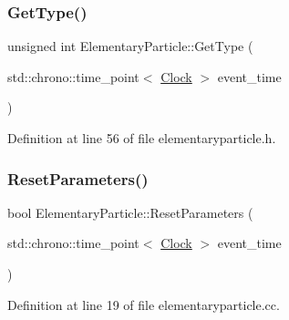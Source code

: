 \subsubsection{\texorpdfstring{Get\+Type()}{GetType()}}
{\footnotesize\ttfamily unsigned int Elementary\+Particle\+::\+Get\+Type (\begin{DoxyParamCaption}\item[{std\+::chrono\+::time\+\_\+point$<$ \mbox{\hyperlink{universe_8h_a0ef8d951d1ca5ab3cfaf7ab4c7a6fd80}{Clock}} $>$}]{event\+\_\+time }\end{DoxyParamCaption})\hspace{0.3cm}{\ttfamily [inline]}}



Definition at line 56 of file elementaryparticle.\+h.

\mbox{\label{class_elementary_particle_ac0f85f34bdfc1d42324201eb7c38e85e}} 
\subsubsection{\texorpdfstring{Reset\+Parameters()}{ResetParameters()}}
{\footnotesize\ttfamily bool Elementary\+Particle\+::\+Reset\+Parameters (\begin{DoxyParamCaption}\item[{std\+::chrono\+::time\+\_\+point$<$ \mbox{\hyperlink{universe_8h_a0ef8d951d1ca5ab3cfaf7ab4c7a6fd80}{Clock}} $>$}]{event\+\_\+time }\end{DoxyParamCaption})}



Definition at line 19 of file elementaryparticle.\+cc.

